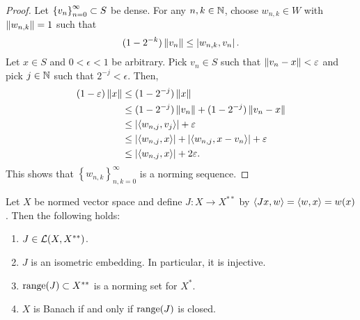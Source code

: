 \documentclass[a4paper]{article}
\begin{document}
\begin{proof}
  
Let $\left\{ v_n \right\}_{n=0}^\infty \subset S$ be dense. 
For any $n, k \in \mathbb{N}$, choose $w_{n, k} \in W$ with 
$\left\lVert w_{n, k}\right\rVert = 1$ such that 
\[
(1 - 2^{-k}) \left\lVert v_n\right\rVert \leq \left\lvert w_{n, k}, v_n\right\rvert.
\]
Let $x \in S$ and $0 < \epsilon < 1$ be arbitrary. 
Pick $v_n \in S$ such that $\left\lVert v_n - x\right\rVert < \varepsilon$ and 
pick $j \in \mathbb{N}$ such that $2^{-j} < \epsilon$. Then, 
\[
\begin{aligned}
(1 - \varepsilon) \left\lVert x\right\rVert 
&\leq (1 - 2^{-j}) \left\lVert x\right\rVert  \\
&\leq (1 - 2^{-j}) \left\lVert v_n\right\rVert + (1 - 2^{-j}) \left\lVert v_n - x\right\rVert \\
&\leq \left\lvert \langle w_{n, j}, v_j \rangle\right\rvert + \varepsilon \\
&\leq \left\lvert \langle w_{n, j}, x \rangle\right\rvert + \left\lvert \langle w_{n, j}, 
x - v_n \rangle\right\rvert + \varepsilon \\
&\leq \left\lvert \langle w_{n, j}, x \rangle\right\rvert + 2 \varepsilon.
\end{aligned}
\]
This shows that $\left\{ w_{n, k} \right\}_{n, k = 0}^\infty$
is a norming sequence.

\end{proof}

\begin{thm}
Let $X$ be normed vector space and define $J: X \to X^{**}$ 
by $\left\langle Jx, w \right\rangle = \left\langle w, x \right\rangle = w(x)$. Then the following
holds:
\begin{enumerate}
\item $J \in \mathcal{L}(X, X^{**})$. 
\item $J$ is an isometric embedding. In particular, it is 
injective.
\item $\operatorname{range}(J) \subset X^{**}$ is a norming set for $X^*$.
\item $X$ is Banach if and only if $\operatorname{range}(J)$ is closed.
\end{enumerate}
\end{thm}
\end{document}
